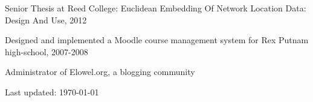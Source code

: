 \documentclass[letterpaper]{article}
\def\footerlink{} %
\renewenvironment{itemize}{\begin{list}{}{\setlength{\leftmargin}{1.5em}}}{\end{list}}%
\begin{document}
\begin{itemize}
\item Senior Thesis at Reed College: Euclidean Embedding Of Network Location Data: Design And Use, 2012
\item Designed and implemented a Moodle course management system for Rex Putnam high-school, 2007-2008
\item Administrator of Elowel.org, a blogging community

\end{itemize}

%


\bigskip

\begin{center}
  \begin{footnotesize}
    Last updated: \today \\
    \href{\footerlink}{\texttt{\footerlink}}
  \end{footnotesize}
\end{center}
\end{document}
